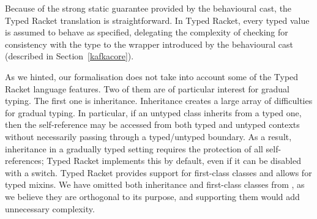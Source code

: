 \documentclass[acmlarge, anonymous, authordraft, review]{acmart} %
\begin{document}
\noindent Because of the strong static guarantee provided by the behavioural cast, the
Typed Racket translation is  straightforward. In Typed Racket, every typed
value is assumed to behave as specified, delegating the complexity of checking
for consistency with the type to the wrapper introduced by the behavioural cast (described in Section~\ref{kafkacore}).

As we hinted, our formalisation does not take into account some of the Typed Racket language features.  Two of them are of particular interest for gradual typing.  The first one is inheritance.
Inheritance creates a large array of difficulties for gradual typing.
In particular, if an untyped class inherits from a typed one, then the self-reference may be accessed from both typed and untyped contexts without
necessarily passing through a typed/untyped boundary. As a result, inheritance
in a gradually typed setting requires the protection of all self-references; Typed Racket implements this by default, even if it can be disabled with a switch.  Typed Racket provides support for first-class classes and allows for
typed mixins.  We have omitted both inheritance and first-class classes from  \kafka, as we believe they are orthogonal to its purpose, and supporting them would add unnecessary complexity.

\end{document}
